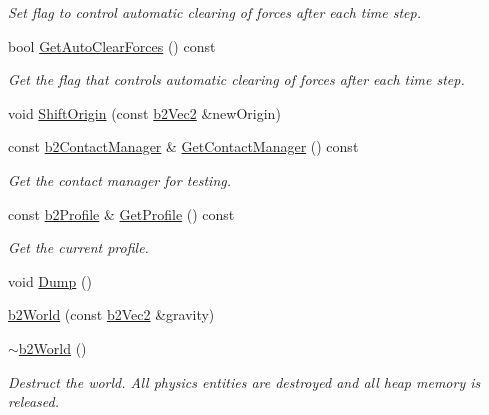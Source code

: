 \begin{DoxyCompactItemize}
\begin{DoxyCompactList}\small\item\em Set flag to control automatic clearing of forces after each time step. \end{DoxyCompactList}\item 
\mbox{\label{classb2World_ae1fa8272edf37a4e2a7be08f6e0a8cc6}} 
bool \hyperlink{classb2World_ae1fa8272edf37a4e2a7be08f6e0a8cc6}{Get\+Auto\+Clear\+Forces} () const
\begin{DoxyCompactList}\small\item\em Get the flag that controls automatic clearing of forces after each time step. \end{DoxyCompactList}\item 
void \hyperlink{classb2World_afc33e20e64252c5be115216051408047}{Shift\+Origin} (const \hyperlink{structb2Vec2}{b2\+Vec2} \&new\+Origin)
\item 
\mbox{\label{classb2World_a3d321151cd851d39bdc8fe52a5be426c}} 
const \hyperlink{classb2ContactManager}{b2\+Contact\+Manager} \& \hyperlink{classb2World_a3d321151cd851d39bdc8fe52a5be426c}{Get\+Contact\+Manager} () const
\begin{DoxyCompactList}\small\item\em Get the contact manager for testing. \end{DoxyCompactList}\item 
\mbox{\label{classb2World_aec4fb0a888e69e0db7f37a4921761711}} 
const \hyperlink{structb2Profile}{b2\+Profile} \& \hyperlink{classb2World_aec4fb0a888e69e0db7f37a4921761711}{Get\+Profile} () const
\begin{DoxyCompactList}\small\item\em Get the current profile. \end{DoxyCompactList}\item 
void \hyperlink{classb2World_a73c1fec260d460514edd335d4c235893}{Dump} ()
\item 
\hyperlink{classb2World_aeccc87fd9e36702c821a8244ca7cd875}{b2\+World} (const \hyperlink{structb2Vec2}{b2\+Vec2} \&gravity)
\item 
\mbox{\label{classb2World_a5250ae4487475c33ccefdead07c768c8}} 
\hyperlink{classb2World_a5250ae4487475c33ccefdead07c768c8}{$\sim$b2\+World} ()
\begin{DoxyCompactList}\small\item\em Destruct the world. All physics entities are destroyed and all heap memory is released. \end{DoxyCompactList}\item 

\end{DoxyCompactItemize}
